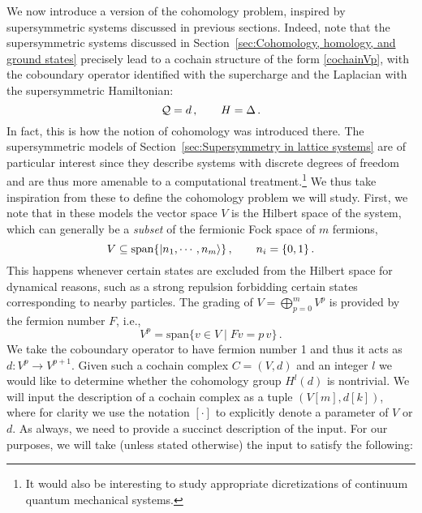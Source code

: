 \documentclass[11pt]{article}
\numberwithin{equation}{section}
\def\cQ{{\cal Q}}
\newcommand\equ[1] {\begin{equation}#1\end{equation}}
\renewcommand\( {\left(}
\renewcommand\) {\right)}
\begin{document}
We now introduce a version of the cohomology problem, inspired by supersymmetric systems discussed in previous sections. Indeed, note that the supersymmetric systems discussed in Section~\ref{sec:Cohomology, homology, and ground states} precisely lead to a cochain structure of the form \eqref{cochainVp}, with the  coboundary operator identified with the supercharge and the Laplacian with the supersymmetric Hamiltonian: 
\equ{
\cQ=d\,,\qquad  H=\Delta\,.
}
In fact, this is how the notion of cohomology was introduced there. The supersymmetric models of Section~\ref{sec:Supersymmetry in lattice systems} are of particular interest since they describe systems with discrete degrees of freedom and are thus more amenable to a computational treatment.\footnote{It would also be interesting to study appropriate dicretizations of continuum quantum mechanical systems. } We thus take inspiration from these to  define the cohomology problem we will study. First, we note that in these models the vector space $V$ is the Hilbert space of the system, which can generally be a {\it subset} of the fermionic Fock space of $m$ fermions,
\equ{
V\subseteq \text{span}\{\ket{n_{1},\cdots,n_{m}}\}\,,\qquad n_i=\{0,1\}\,.
}
This happens whenever certain states are excluded from the Hilbert space for dynamical reasons, such as a strong repulsion forbidding certain states corresponding to nearby particles. The grading of $V=\bigoplus_{p=0}^m V^p$ is  provided by the fermion number $F$, i.e., 
\equ{
V^p=\text{span}\{v\in V\;|\; F v=p \, v\}\,.
}
We take the coboundary operator to have fermion number 1 and thus it acts as $d: V^p\to V^{p+1}$.  Given such a cochain complex $C=(V,d)$ and an integer $l$ we would like to determine whether the cohomology group $H^l(d)$ is nontrivial. We will input the description of a cochain complex as a tuple $(V[m],d[k])$, where for clarity we use the notation $[\cdot]$ to explicitly denote a parameter of $V$ or $d$. As always, we need to provide a succinct description of the input. For our purposes, we will take  (unless stated otherwise) the input to satisfy the following:
\end{document}
